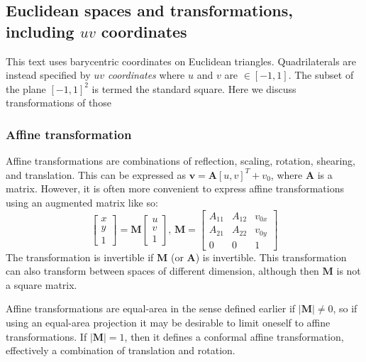 \documentclass{amsart}[12pt]
\begin{document}
\subsection{Euclidean spaces and transformations, including $uv$ coordinates}
This text uses barycentric coordinates on Euclidean triangles.
Quadrilaterals are instead specified by \textit{$uv$ coordinates} where
$u$ and $v$ are $\in [-1, 1]$. The subset of the plane $[-1, 1]^2$ is termed
the standard square. Here we discuss transformations of those

\subsubsection{Affine transformation}
Affine transformations are combinations of reflection, scaling, rotation,
shearing, and translation. This can be expressed as $\mathbf v = \mathbf A [u,
v]^T + v_0$, where $\mathbf A$ is a matrix. However, it is often more
convenient to express affine transformations using an augmented matrix like so:
\begin{equation}
  \begin{bmatrix}  x \\  y \\  1 \end{bmatrix}
   = \mathbf M
    \begin{bmatrix}  u \\  v \\  1 \end{bmatrix},\,
    \mathbf M = \begin{bmatrix}
       A_{11} & A_{12} & v_{0x} \\
       A_{21} & A_{22} & v_{0y} \\
       0 & 0 & 1
       \end{bmatrix}
\end{equation}
The transformation is invertible if $\mathbf M$ (or $\mathbf A$) is
invertible. This transformation can also transform between spaces of different
dimension, although then $\mathbf M$ is not a square matrix.

Affine transformations are equal-area in the sense defined earlier if
$|\mathbf M| \ne 0$, so if using an equal-area projection it may be desirable
to limit oneself to affine transformations. If $|\mathbf M| = 1$, then it defines a conformal affine transformation, effectively a combination of translation and rotation.
\end{document}
